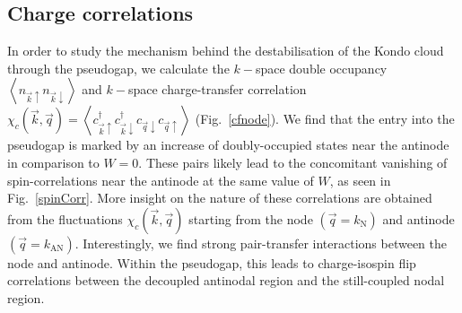 \documentclass[reprint,hidelinks,onecolumn]{revtex4-2}
\begin{document}
\subsection{Charge correlations}
In order to study the mechanism behind the destabilisation of the Kondo cloud through the pseudogap, we calculate the \(k-\)space double occupancy \(\left<n_{\vec k \uparrow} n_{\vec k \downarrow}\right>\) and \(k-\)space charge-transfer correlation \(\chi_c(\vec k, \vec q) = \left<c^\dagger_{\vec k \uparrow} c^\dagger_{\vec k \downarrow} c_{\vec q \downarrow}c_{\vec q \uparrow}\right>\) (Fig.~\ref{cfnode}). We find that the entry into the pseudogap is marked by an increase of doubly-occupied states near the antinode in comparison to \(W=0\). These pairs likely lead to the concomitant vanishing of spin-correlations near the antinode at the same value of \(W\), as seen in Fig.~\ref{spinCorr}. More insight on the nature of these correlations are obtained from the fluctuations \(\chi_c(\vec k, \vec q)\) starting from the node \((\vec q = k_\text{N})\) and antinode \(\left( \vec q = k_\text{AN}\right) \). Interestingly, we find strong pair-transfer interactions between the node and antinode. Within the pseudogap, this leads to charge-isospin flip correlations between the decoupled antinodal region and the still-coupled nodal region.
\end{document}
